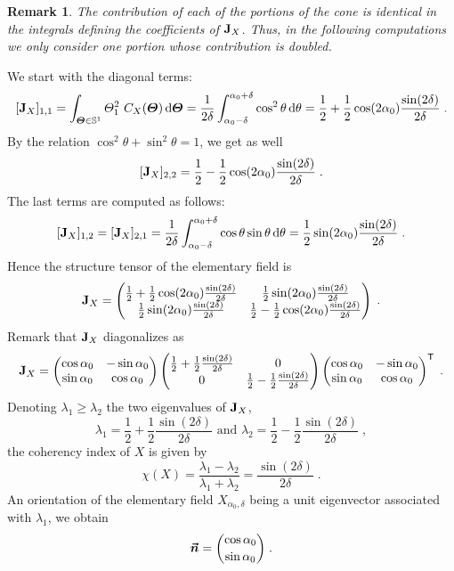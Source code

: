 \documentclass{elsarticle}
\newtheorem{remark}{Remark}
\begin{document}
\begin{remark}
The contribution of each of the portions of the cone is identical in the integrals defining the coefficients of $\mathbf{J}_X$. Thus, in the following computations we only consider one portion whose contribution is doubled.
\end{remark}

We start with the diagonal terms:
\[
[\mathbf{J}_X]_{1,1}=\int_{\bm{\Theta}\in\mathbb{S}^{1}} {\Theta}_{1}^2 ~C_X(\bm{\Theta})\mathop{}\mathopen{}\mathrm{d} \bm{\Theta}
= \frac{1}{2\delta} \int_{\alpha_0-\delta}^{\alpha_0+\delta}\cos^2 \theta \mathop{}\mathopen{}\mathrm{d} \theta
=\frac{1}{2}+\frac 1 2 \cos(2\alpha_0)\frac{\sin(2\delta)}{2\delta}\;.
\]
By the relation $\cos^2\theta+\sin^2\theta=1$, we get as well
\[
[\mathbf{J}_X]_{2,2}=\frac{1}{2}-\frac 1 2 \cos(2\alpha_0)\frac{\sin(2\delta)}{2\delta}\;.
\]
The last terms are computed as follows:
\[
[\mathbf{J}_X]_{1,2}=[\mathbf{J}_X]_{2,1}= \frac{1}{2\delta} \int_{\alpha_0-\delta}^{\alpha_0+\delta}\cos \theta\sin \theta \mathop{}\mathopen{}\mathrm{d} \theta
=\frac 1 2\sin(2\alpha_0)\frac{\sin(2\delta)}{2\delta}\;.
\]
Hence the structure tensor of the elementary field is
\[
\mathbf{J}_X=\begin{pmatrix}
\frac{1}{2}+\frac 1 2 \cos(2\alpha_0)\frac{\sin(2\delta)}{2\delta} & \frac 1 2\sin(2\alpha_0)\frac{\sin(2\delta)}{2\delta} \\ 
\frac 1 2\sin(2\alpha_0)\frac{\sin(2\delta)}{2\delta} & \frac{1}{2}-\frac 1 2 \cos(2\alpha_0)\frac{\sin(2\delta)}{2\delta}\end{pmatrix}\;.
\]
Remark that $\mathbf{J}_X$ diagonalizes as
\[
\mathbf{J}_X=\begin{pmatrix}
\cos \alpha_0 & -\sin \alpha_0 \\ \sin \alpha_0 & \cos \alpha_0\end{pmatrix} 
\begin{pmatrix}\frac 1 2+\frac 1 2\frac{\sin(2\delta)}{2\delta} & 0 \\ 0 & \frac 1 2-\frac 1 2\frac{\sin(2\delta)}{2\delta}\end{pmatrix}
\begin{pmatrix}\cos \alpha_0 & -\sin \alpha_0 \\ \sin \alpha_0 & \cos \alpha_0\end{pmatrix}^{\mathsf{T}}\;.
\]
Denoting $\lambda_1\geq \lambda_2$ the two eigenvalues of $\mathbf{J}_X$,
\[
\lambda_1=\frac 1 2+\frac 1 2\frac{\sin(2\delta)}{2\delta} \mbox{ and }
\lambda_2=\frac 1 2-\frac 1 2\frac{\sin(2\delta)}{2\delta}\;,
\]
the coherency index of $X$ is given by
\[
\chi(X)=\frac{\lambda_1-\lambda_2}{\lambda_1+\lambda_2}=\frac{\sin(2\delta)}{2\delta}\;.
\]
An orientation of the elementary field $X_{\alpha_0,\delta}$ being a unit eigenvector associated with $\lambda_1$, we obtain  
\[
\bm{\vec n}=\binom{\cos \alpha_0}{\sin \alpha_0}\;.
\]
\end{document}
